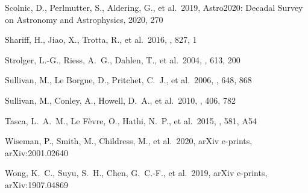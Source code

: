 \documentclass[]{aa} %
\begin{document}
\begin{thebibliography}{}
 Scolnic, D., Perlmutter, S.,
Aldering, G., et al.\ 2019, Astro2020: Decadal Survey on Astronomy and
Astrophysics, 2020, 270

 Shariff, H., Jiao, X., Trotta, R.,
et al.\ 2016, \apj, 827, 1

 Strolger, L.-G., Riess, A.~G.,
Dahlen, T., et al.\ 2004, \apj, 613, 200

 Sullivan, M., Le  Borgne, D.,
Pritchet, C.~J., et al.\ 2006, \apj, 648, 868 

 Sullivan, M., Conley, A., Howell,
D.~A., et al.\ 2010, \mnras, 406, 782


 Tasca, L.~A.~M., Le F{\`e}vre, O.,
Hathi, N.~P., et al.\ 2015, \aap, 581, A54


 Wiseman, P., Smith, M., Childress,
M., et al.\ 2020, arXiv e-prints, arXiv:2001.02640

 Wong, K.~C., Suyu, S.~H., Chen, G.~C.-F.,
et al.\ 2019, arXiv e-prints, arXiv:1907.04869

\end{thebibliography}
\end{document}
